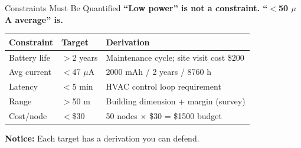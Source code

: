 \documentclass[aspectratio=169,11pt]{beamer}
\begin{document}
\begin{frame}{Constraints Must Be Quantified}
    \textbf{``Low power'' is not a constraint. ``$<$50 $\mu$A average'' is.}
    
    \vspace{0.3cm}
    \begin{table}
        \centering
        \small
        \begin{tabular}{@{}p{2.5cm}p{2.5cm}p{7cm}@{}}
            \toprule
            \textbf{Constraint} & \textbf{Target} & \textbf{Derivation} \\
            \midrule
            Battery life & $>$2 years & Maintenance cycle; site visit cost \$200 \\
            \addlinespace
            Avg current & $<$47 $\mu$A & 2000 mAh / 2 years / 8760 h \\
            \addlinespace
            Latency & $<$5 min & HVAC control loop requirement \\
            \addlinespace
            Range & $>$50 m & Building dimension + margin (survey) \\
            \addlinespace
            Cost/node & $<$\$30 & 50 nodes $\times$ \$30 = \$1500 budget \\
            \bottomrule
        \end{tabular}
    \end{table}
    
    \vspace{0.2cm}
    \textbf{Notice:} Each target has a derivation you can defend.
\end{frame}
\end{document}
